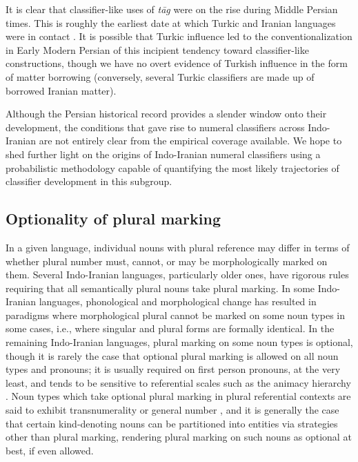 \documentclass[11pt]{article}
\begin{document}
It is clear that classifier-like uses of {\it t\=ag} were on the rise during Middle Persian times. This is roughly the earliest date at which Turkic and Iranian languages were in contact \citep{Golden2006}. It is possible that Turkic influence led to the conventionalization in Early Modern Persian of this incipient tendency toward classifier-like constructions, though we have no overt evidence of Turkish influence in the form of matter borrowing (conversely, several Turkic classifiers are made up of borrowed Iranian matter). 

Although the Persian historical record provides a slender window onto their development, the conditions that gave rise to numeral classifiers across Indo-Iranian are not entirely clear from the empirical coverage available. We hope to shed further light on the origins of Indo-Iranian numeral classifiers using a probabilistic methodology capable of quantifying the most likely trajectories of classifier development in this subgroup.



\subsection{Optionality of plural marking}
In a given language, individual nouns with plural reference may differ in terms of whether plural number must, cannot, or may be morphologically marked on them.
Several Indo-Iranian languages, particularly older ones, have rigorous rules requiring that all semantically plural nouns take plural marking. 
In some Indo-Iranian languages, phonological and morphological change has resulted in paradigms where morphological plural cannot be marked on some noun types in some cases, i.e., where singular and plural forms are formally identical. 
In the remaining Indo-Iranian languages, plural marking on some noun types is optional, though  it is rarely the case that optional plural marking is allowed on all noun types and pronouns; it is usually required on first person pronouns, at the very least, and tends to be sensitive to referential scales such as the animacy hierarchy \citep{Silverstein1976}. 
Noun types which take optional plural marking in plural referential contexts are said to exhibit transnumerality or general number \citep[cf.][9--19]{Corbett2000}, and it is generally the case that certain kind-denoting nouns can be partitioned into entities via strategies other than plural marking, rendering plural marking on such nouns as optional at best, if even allowed. 
\end{document}
